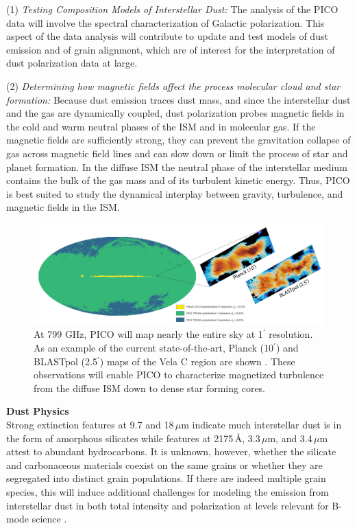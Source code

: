 \documentclass[PICOReport.tex]{subfiles}
\begin{document}
(1) {\em Testing Composition Models of Interstellar Dust:}
The analysis of the PICO data will involve the spectral characterization of Galactic polarization. 
This aspect of the data analysis will contribute to update and test models of dust emission and of grain alignment, which are of interest for 
the interpretation of dust polarization data at large.


(2) {\em Determining how magnetic fields affect the process molecular cloud and star formation:}
Because dust emission traces dust mass, and since the interstellar dust and the 
gas are dynamically coupled, dust polarization probes magnetic fields in 
the cold and warm neutral phases of the ISM and in molecular gas.
If the magnetic fields are sufficiently strong, they can prevent the gravitation collapse of gas across magnetic field lines and can slow down or limit the process of star and planet formation.
In the diffuse ISM the neutral phase of the interstellar medium contains the bulk of the gas mass 
and of its turbulent kinetic energy. Thus, PICO is best suited to study the dynamical interplay between gravity, turbulence, and magnetic fields in the ISM.  

\begin{figure}
    \centering
    \includegraphics[width=6in]{galsci_fig.pdf}
    \caption{At 799 GHz, PICO will map nearly the entire sky at 1$^{\prime}$ resolution. As an example of the current state-of-the-art, Planck (10$^{\prime}$) and BLASTpol (2.5$^{\prime}$) maps of the Vela C region are shown \citep{Fissel2016}. These observations will enable PICO to characterize magnetized turbulence from the diffuse ISM down to dense star forming cores.}
    \label{fig:allsky}
\end{figure}

{\bf Dust Physics}\\
Strong extinction features at 9.7 and 18\,$\mu$m indicate much interstellar dust is in the form of amorphous silicates while features at 2175\,\AA, 3.3\,$\mu$m, and 3.4\,$\mu$m attest to abundant hydrocarbons. It is unknown, however, whether the silicate and carbonaceous materials coexist on the same grains or whether they are segregated into distinct grain populations. If there are indeed multiple grain species, this will induce additional challenges for modeling the emission from interstellar dust in both total intensity and polarization at levels relevant for B-mode science \citep{Hensley2018}.
\end{document}

